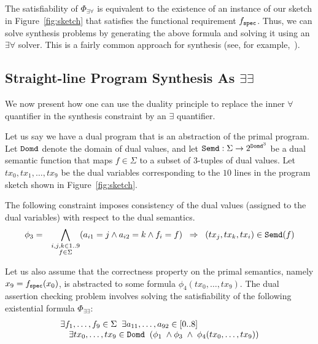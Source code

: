 \documentclass[preprint]{sig-alternate-05-2015}
\def\semd{{\tt{Semd}}}
\def\domd{{\tt{Domd}}}
\def\spec{{\tt{spec}}}
\def\Sig{{\Sigma}}
\begin{document}
The satisfiability of $\Phi_{\exists\forall}$ is equivalent to the existence 
of an instance of our sketch in Figure~\ref{fig:sketch}
that satisfies the functional requirement $f_\spec$.
Thus, we can solve synthesis problems by generating the above formula
and solving it using an $\exists\forall$ solver.
This is a fairly common approach for synthesis 
(see, for example,~\cite{bitvector}). %

\subsection{Straight-line Program Synthesis As $\exists\exists$}

We now present how one can use the duality principle to replace the inner
$\forall$ quantifier in the synthesis constraint by an $\exists$ quantifier.

Let us say we have a dual program that is an abstraction of the
primal program.
Let $\domd$ denote the domain of dual values, and let
$\semd: \Sig \rightarrow 2^{\domd^3}$ be a
dual semantic function that maps $f\in\Sig$ to a subset of 3-tuples
of dual values.
Let
$tx_0, tx_1,\ldots,tx_9$ be the dual variables corresponding to the
$10$ lines in the program sketch shown in Figure~\ref{fig:sketch}.

The following constraint imposes consistency of the dual values
(assigned to the dual variables) with respect to the dual semantics.
\begin{eqnarray*}
  \phi_3 & = & \bigwedge_{\substack{i,j,k\in 1..9\\ f\in\Sig}} (a_{i1} = j \wedge a_{i2}=k \wedge f_i=f)\;\;\Rightarrow\;\;
    (tx_j,tx_k,tx_i)\in \semd(f)
\end{eqnarray*}

Let us also assume that the correctness property on the primal semantics, namely
$x_9 = f_\spec(x_0)$, is abstracted to
some formula $\phi_4(tx_0,\ldots,tx_9)$.
The dual assertion checking problem involves solving the satisfiability of
the following existential formula $\Phi_{\exists\exists}$:
\[
  \begin{array}{l}
  \exists{f_1,\ldots,f_9}\in\Sig\;\;
  \exists{a_{11},\ldots,a_{92}}\in [0..8]\;\;
  \\ \quad
  \exists{tx_0,\ldots,tx_9}\in\domd\;\;
  (\phi_1 \; \wedge
  \phi_3 \;\wedge\; \phi_4(tx_0,\ldots,tx_9))
\end{array}
\]
\end{document}

